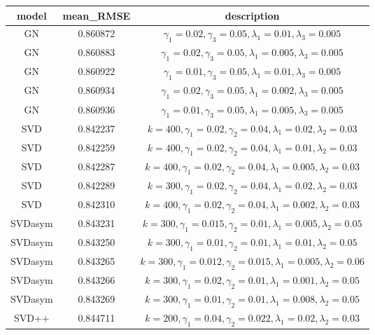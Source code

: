 \documentclass[journal]{IEEEtran}
\begin{document}
\begin{table}[ht]
  \centering
  \begin{tabular}{*{3}{|c}|}
    \hline
    \bf model & \bf mean\_RMSE & \bf description \\ \hline 
    GN & 0.860872 & $\gamma_1 = 0.02, \gamma_3 = 0.05, \lambda_1 = 0.01, \lambda_3 = 0.005$  \\ \hline
    GN & 0.860883 & $\gamma_1 = 0.02, \gamma_3 = 0.05, \lambda_1 = 0.005, \lambda_3 = 0.005$  \\ \hline
    GN & 0.860922 & $\gamma_1 = 0.01, \gamma_3 = 0.05, \lambda_1 = 0.01, \lambda_3 = 0.005$  \\ \hline
    GN & 0.860934 & $\gamma_1 = 0.02, \gamma_3 = 0.05, \lambda_1 = 0.002, \lambda_3 = 0.005$  \\ \hline
    GN & 0.860936 & $\gamma_1 = 0.01, \gamma_3 = 0.05, \lambda_1 = 0.005, \lambda_3 = 0.005$  \\ \hline
    SVD & 0.842237 & $k = 400, \gamma_1 = 0.02, \gamma_2 = 0.04, \lambda_1 = 0.02, \lambda_2 = 0.03$  \\ \hline
    SVD & 0.842259 & $k = 400, \gamma_1 = 0.02, \gamma_2 = 0.04, \lambda_1 = 0.01, \lambda_2 = 0.03$  \\ \hline
    SVD & 0.842287 & $k = 400, \gamma_1 = 0.02, \gamma_2 = 0.04, \lambda_1 = 0.005, \lambda_2 = 0.03$  \\ \hline
    SVD & 0.842289 & $k = 300, \gamma_1 = 0.02, \gamma_2 = 0.04, \lambda_1 = 0.02, \lambda_2 = 0.03$  \\ \hline
    SVD & 0.842310 & $k = 400, \gamma_1 = 0.02, \gamma_2 = 0.04, \lambda_1 = 0.002, \lambda_2 = 0.03$  \\ \hline
    SVDasym & 0.843231 & $k = 300, \gamma_1 = 0.015, \gamma_2 = 0.01, \lambda_1 = 0.005, \lambda_2 = 0.05$  \\ \hline
    SVDasym & 0.843250 & $k = 300, \gamma_1 = 0.01, \gamma_2 = 0.01, \lambda_1 = 0.01, \lambda_2 = 0.05$  \\ \hline
    SVDasym & 0.843265 & $k = 300, \gamma_1 = 0.012, \gamma_2 = 0.015, \lambda_1 = 0.005, \lambda_2 = 0.06$  \\ \hline
    SVDasym & 0.843266 & $k = 300, \gamma_1 = 0.02, \gamma_2 = 0.01, \lambda_1 = 0.001, \lambda_2 = 0.05$  \\ \hline
    SVDasym & 0.843269 & $k = 300, \gamma_1 = 0.01, \gamma_2 = 0.01, \lambda_1 = 0.008, \lambda_2 = 0.05$  \\ \hline
    SVD++ & 0.844711 & $k = 200, \gamma_1 = 0.04, \gamma_2 = 0.022, \lambda_1 = 0.02, \lambda_2 = 0.03$  \\ \hline

\end{tabular}
\end{table}
\end{document}
